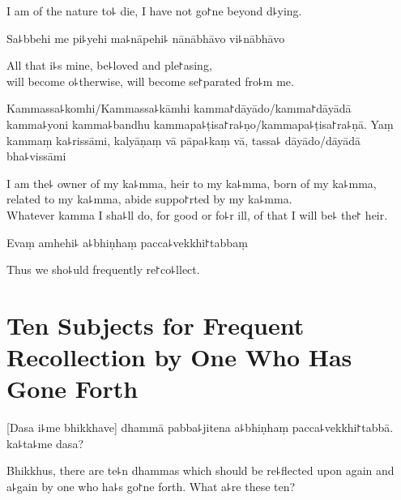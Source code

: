 \begin{english}
  I am of the nature to꜕ die, I have not go꜓ne beyond d꜕ying.
\end{english}

Sa꜕bbehi me pi꜕yehi ma꜕nāpehi꜕ nānābhāvo vi꜕nābhāvo

\begin{english}
  All that i꜕s mine, be꜕loved and ple꜓asing,\\
  will become o꜕therwise, will become se꜓parated fro꜕m me.
\end{english}

Kammassa꜕komhi/Kammassa꜕kāmhi kamma꜓dāyādo/kamma꜓dāyādā kamma꜕yoni kamma꜕bandhu kammapa꜕ṭisa꜓ra꜕ṇo/kammapa꜕ṭisa꜓ra꜕ṇā. Yaṃ kammaṃ ka꜕rissāmi, kalyāṇaṃ vā pāpa꜕kaṃ vā, tassa꜕ dāyādo/dāyādā bha꜕vissāmi

\begin{english}
  I am the꜕ owner of my ka꜕mma, heir to my ka꜕mma, born of my ka꜕mma,\\
  related to my ka꜕mma, abide suppo꜓rted by my ka꜕mma.\\
  Whatever kamma I sha꜕ll do, for good or fo꜕r ill, of that I will be꜕ the꜓ heir.
\end{english}

Evaṃ amhehi꜕ a꜕bhiṇhaṃ pacca꜕vekkhi꜓tabbaṃ

\begin{english}
  Thus we sho꜕uld frequently re꜓co꜕llect.
\end{english}

\chapter[Ten Subjects]{Ten Subjects for Frequent Recollection by One Who Has Gone Forth}%

\enlargethispage{\baselineskip}

\begin{leader}
\end{leader}

[Dasa i꜕me bhikkhave] dhammā pabba꜕jitena a꜕bhiṇhaṃ pacca꜕vekkhi꜓tabbā. ka꜕ta꜕me dasa?

\begin{english}
  Bhikkhus, there are te꜕n dhammas which should be re꜕flected upon again and a꜕gain by one who ha꜕s go꜓ne forth. What a꜕re these ten?
\end{english}

